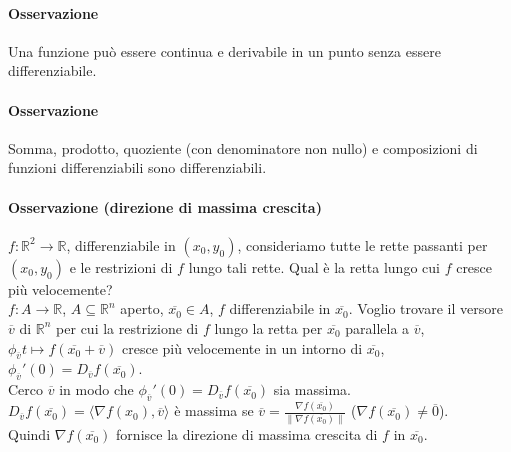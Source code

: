 \documentclass{article}
\newcommand{\R}{\mathbb{R}}
\begin{document}
\paragraph{{Osservazione}}
Una funzione può essere continua e derivabile in un punto senza essere differenziabile.

\paragraph{{Osservazione}}
Somma, prodotto, quoziente (con denominatore non nullo) e composizioni di funzioni differenziabili sono differenziabili.

\paragraph{{Osservazione (direzione di massima crescita)}}
$f:\R^2\rightarrow\R$, differenziabile in $(x_0,y_0)$, consideriamo tutte le rette passanti per $(x_0,y_0)$ e le restrizioni di $f$ lungo tali rette. Qual è la retta lungo cui $f$ cresce più velocemente?\\
$f:A \rightarrow\R$, $A\subseteq\R^n$ aperto, $\overline{x_0}\in A$, $f$ differenziabile in $\overline{x_0}$. Voglio trovare il versore $\overline{v}$ di $\R^n$ per cui la restrizione di $f$ lungo la retta per $\overline{x_0}$ parallela a $\overline{v}$, $\phi_{\overline{v}}t\mapsto f(\overline{x_0}+\overline{v})$ cresce più velocemente in un intorno di $\overline{x_0}$, $\phi_{\overline{v}}'(0)=D_{\overline{v}}f(\overline{x_0})$.\\
Cerco $\overline{v}$ in modo che $\phi_{\overline{v}}'(0)=D_{\overline{v}}f(\overline{x_0})$ sia massima. $D_{\overline{v}}f(\overline{x_0})=\langle \nabla f(x_0),\overline{v} \rangle$ è massima se $\overline{v}=\frac{\nabla f(\overline{x_0})}{\|\nabla f(\overline{x_0})\|}$ ($\nabla f(\overline{x_0})\neq \overline{0}$).\\
Quindi $\nabla f(\overline{x_0})$ fornisce la direzione di massima crescita di $f$ in $\overline{x_0}$.\\
\end{document}
